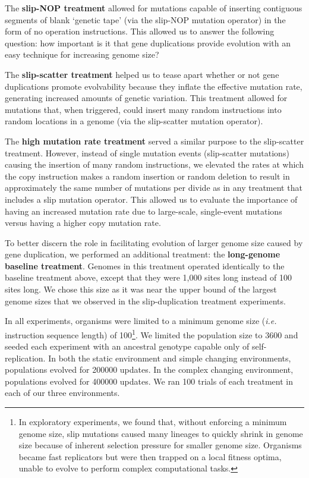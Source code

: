 The \textbf{slip-NOP treatment} allowed for mutations capable of inserting contiguous segments of blank `genetic tape' (via the slip-NOP mutation operator) in the form of no operation instructions. This allowed us to answer the following question: how important is it that gene duplications provide evolution with an easy technique for increasing genome size?

The \textbf{slip-scatter treatment} helped us to tease apart whether or not gene duplications promote evolvability because they inflate the effective mutation rate, generating increased amounts of genetic variation. This treatment allowed for mutations that, when triggered, could insert many random instructions into random locations in a genome (via the slip-scatter mutation operator).

The \textbf{high mutation rate treatment} served a similar purpose to the slip-scatter treatment. However, instead of single mutation events (slip-scatter mutations) causing the insertion of many random instructions, we elevated the rates at which the copy instruction makes a random insertion or random deletion to result in approximately the same number of mutations per divide as in any treatment that includes a slip mutation operator. This allowed us to evaluate the importance of having an increased mutation rate due to large-scale, single-event mutations versus having a higher copy mutation rate.

To better discern the role in facilitating evolution of larger genome size caused by gene duplication, we performed an additional treatment: the \textbf{long-genome baseline treatment}.
Genomes in this treatment operated identically to the baseline treatment above, except that they were 1,000 sites long instead of 100 sites long.
We chose this size as it was near the upper bound of the largest genome sizes that we observed in the slip-duplication treatment experiments. 

In all experiments, organisms were limited to a minimum genome size (\textit{i.e.} instruction sequence length) of 100\footnote{
In exploratory experiments, we found that, without enforcing a minimum genome size, slip mutations caused many lineages to quickly shrink in genome size because of inherent selection pressure for smaller genome size. Organisms became fast replicators but were then trapped on a local fitness optima, unable to evolve to perform complex computational tasks.
}.
We limited the population size to 3600 and seeded each experiment with an ancestral genotype capable only of self-replication. In both the static environment and simple changing environments, populations evolved for 200000 updates. In the complex changing environment, populations evolved for 400000 updates. We ran 100 trials of each treatment in each of our three environments.

